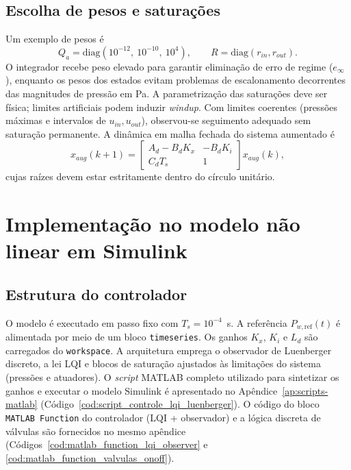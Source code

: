 \subsection{Escolha de pesos e saturações}
Um exemplo de pesos é
\[
    Q_a=\mathrm{diag}(10^{-12},\ 10^{-10},\ 10^{4}),\qquad
    R=\mathrm{diag}(r_{in},r_{out}).
\]
O integrador recebe peso elevado para garantir eliminação de erro de regime ($e_\infty$), enquanto os pesos dos estados evitam problemas de escalonamento decorrentes das magnitudes de pressão em Pa. A parametrização das saturações deve ser física; limites artificiais podem induzir \emph{windup}. Com limites coerentes (pressões máximas e intervalos de $u_{in},u_{out}$), observou-se seguimento adequado sem saturação permanente.
A dinâmica em malha fechada do sistema aumentado é
\[
    x_{aug}(k+1)=
    \begin{bmatrix}
        A_d - B_d K_x & - B_d K_i \\
        C_d T_s       & 1
    \end{bmatrix}
    x_{aug}(k),
\]
cujas raízes devem estar estritamente dentro do círculo unitário.

\section{Implementação no modelo não linear em Simulink}
\label{sec:implementacao-simulink}
\subsection{Estrutura do controlador}
\label{sec:estrutura-controlador-simulink}
O modelo é executado em passo fixo com $T_s=10^{-4}$~s. A referência $P_{w,\text{ref}}(t)$ é alimentada por meio de um bloco \texttt{timeseries}. Os ganhos $K_x$, $K_i$ e $L_d$ são carregados do \texttt{workspace}. A arquitetura emprega o observador de Luenberger discreto, a lei LQI e blocos de saturação ajustados às limitações do sistema (pressões e atuadores). O \textit{script} MATLAB completo utilizado para sintetizar os ganhos e executar o modelo Simulink é apresentado no Apêndice~\ref{ap:scripts-matlab} (Código~\ref{cod:script_controle_lqi_luenberger}). O código do bloco \texttt{MATLAB Function} do controlador (LQI + observador) e a lógica discreta de válvulas são fornecidos no mesmo apêndice (Códigos~\ref{cod:matlab_function_lqi_observer} e \ref{cod:matlab_function_valvulas_onoff}).

